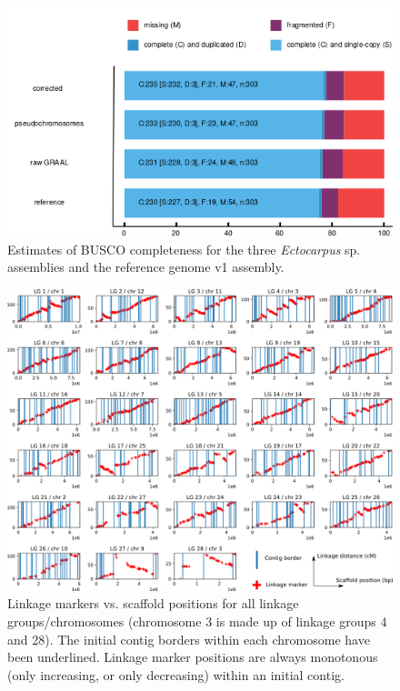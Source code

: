 \begin{suppsection}
\begin{figure}[ht]
\centering
    \includegraphics{fig/instagraal/s2.png}
    \caption{Estimates of BUSCO completeness for the three \textit{Ectocarpus} sp. assemblies and the reference genome v1 assembly.}
    \label{fig:instagraal_s2}
\end{figure}

\begin{figure}[ht]
\centering
    \includegraphics[width=13.5cm]{fig/instagraal/s3.png}
    \caption{Linkage markers vs. scaffold positions for all linkage groups/chromosomes (chromosome 3 is made up of linkage groups 4 and 28). The initial contig borders within each chromosome have been underlined. Linkage marker positions are always monotonous (only increasing, or only decreasing) within an initial contig.}
    \label{fig:instagraal_s3}
\end{figure}


\end{suppsection}
